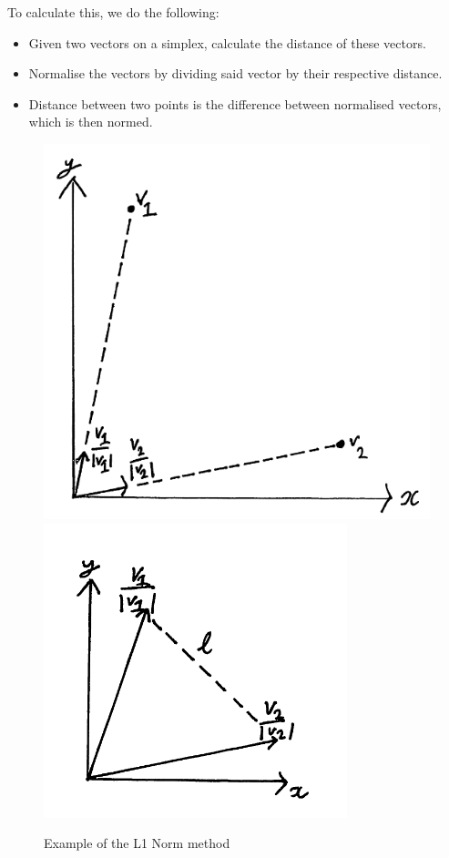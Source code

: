 \documentclass[12pt,a4paper]{report}
\begin{document}
To calculate this, we do the following:
\begin{itemize}
    \item Given two vectors on a simplex, calculate the distance of these vectors.
    \item Normalise the vectors by dividing said vector by their respective distance.
    \item Distance between two points is the difference between normalised vectors, which is then normed. 
\end{itemize}

\begin{figure}
\includegraphics[scale=0.4]{Chapters/images/L1Norm1.png}
\includegraphics[scale=0.6]{Chapters/images/L1Norm2.png}


\caption{Example of the L1 Norm method}
\end{figure}
\end{document}
